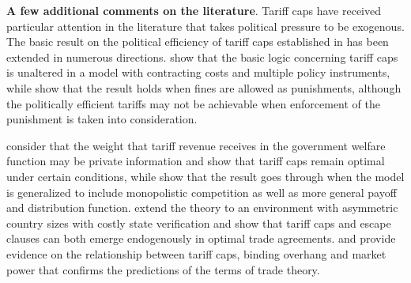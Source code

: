 
\textbf{A few additional comments on the literature}. Tariff caps have received particular attention in the literature that takes political pressure to be exogenous. The basic result on the political efficiency of tariff caps established in \Textcite{bs2005} has been extended in numerous directions. \Textcite{hms} show that the basic logic concerning tariff caps is unaltered in a model with contracting costs and multiple policy instruments, while \Textcite{ls} show that the result holds when fines are allowed as punishments, although the politically efficient tariffs may not be achievable when enforcement of the punishment is taken into consideration. 

\Textcite{ab2012} consider that the weight that tariff revenue receives in the government welfare function may be private information and show that tariff caps remain optimal under certain conditions, while \Textcite{ab2013} show that the result goes through when the \Textcite{bs2005} model is generalized to include monopolistic competition as well as more general payoff and distribution function. \Textcite{bb} extend the theory to an environment with asymmetric country sizes with costly state verification and show that tariff caps and escape clauses can both emerge endogenously in optimal trade agreements. \Textcite{bbr} and \Textcite{nos} provide evidence on the relationship between tariff caps, binding overhang and market power that confirms the predictions of the terms of trade theory.

		
